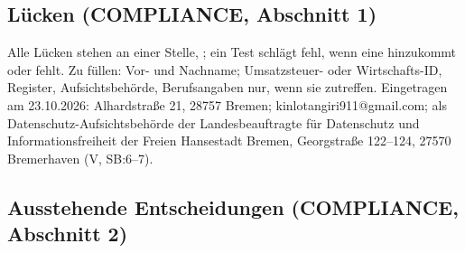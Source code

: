 \documentclass[10pt,parskip=half-]{scrartcl}
\begin{document}
\subsection{Lücken (COMPLIANCE, Abschnitt 1)}
Alle Lücken stehen an einer Stelle, ; ein Test schlägt fehl, wenn
eine hinzukommt oder fehlt. Zu füllen: Vor- und Nachname; Umsatzsteuer- oder Wirtschafts-ID,
Register, Aufsichtsbehörde, Berufsangaben nur, wenn sie zutreffen. Eingetragen am 23.10.2026:
Alhardstraße 21, 28757 Bremen; kinlotangiri911@gmail.com; als Datenschutz-Aufsichtsbehörde der
Landesbeauftragte für Datenschutz und Informationsfreiheit der Freien Hansestadt Bremen,
Georgstraße 122--124, 27570 Bremerhaven (V, SB:6--7).

\subsection{Ausstehende Entscheidungen (COMPLIANCE, Abschnitt 2)}
\end{document}
